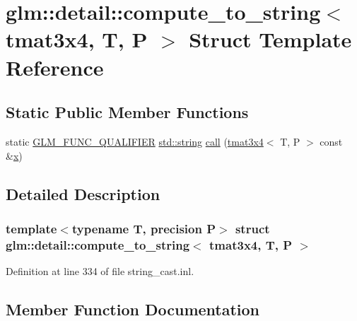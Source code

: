 \hypertarget{structglm_1_1detail_1_1compute__to__string_3_01tmat3x4_00_01_t_00_01_p_01_4}{}\section{glm\+::detail\+::compute\+\_\+to\+\_\+string$<$ tmat3x4, T, P $>$ Struct Template Reference}
\label{structglm_1_1detail_1_1compute__to__string_3_01tmat3x4_00_01_t_00_01_p_01_4}
\subsection*{Static Public Member Functions}
\begin{DoxyCompactItemize}
\item 
static \mbox{\hyperlink{setup_8hpp_a33fdea6f91c5f834105f7415e2a64407}{G\+L\+M\+\_\+\+F\+U\+N\+C\+\_\+\+Q\+U\+A\+L\+I\+F\+I\+ER}} \mbox{\hyperlink{glad_8h_ac83513893df92266f79a515488701770}{std\+::string}} \mbox{\hyperlink{structglm_1_1detail_1_1compute__to__string_3_01tmat3x4_00_01_t_00_01_p_01_4_ad496094b177c77e467902ffb5bc3b0db}{call}} (\mbox{\hyperlink{structglm_1_1tmat3x4}{tmat3x4}}$<$ T, P $>$ const \&\mbox{\hyperlink{glad_8h_a92d0386e5c19fb81ea88c9f99644ab1d}{x}})
\end{DoxyCompactItemize}


\subsection{Detailed Description}
\subsubsection*{template$<$typename T, precision P$>$\newline
struct glm\+::detail\+::compute\+\_\+to\+\_\+string$<$ tmat3x4, T, P $>$}



Definition at line 334 of file string\+\_\+cast.\+inl.



\subsection{Member Function Documentation}
\mbox{\label{structglm_1_1detail_1_1compute__to__string_3_01tmat3x4_00_01_t_00_01_p_01_4_ad496094b177c77e467902ffb5bc3b0db}} 
